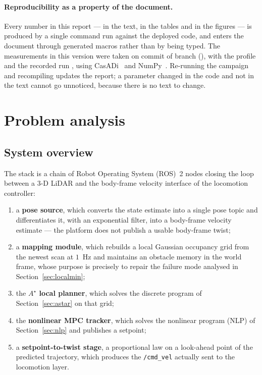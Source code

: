 \documentclass[11pt,a4paper]{article}
\newcommand{\astar}{$A^\star$}
\begin{document}
\paragraph{Reproducibility as a property of the document.}
\begin{sloppypar}
Every number in this report --- in the text, in the tables and in the figures --- is produced by a single
command run against the deployed code, and enters the document through generated macros rather than by being
typed. The measurements in this version were taken on commit \texttt{\resCommit} of branch
\texttt{\resBranch} (\resDate), with the profile \resProfile{} and the recorded run \resBag, using
CasADi~\resCasadi{} and NumPy~\resNumpy. Re-running the campaign and recompiling updates the report;
a parameter changed in the code and not in the text cannot go unnoticed, because there is no text to change.
\end{sloppypar}

\section{Problem analysis}
\label{sec:problem}

\subsection{System overview}
\label{sec:overview}

The stack is a chain of Robot Operating System (ROS)~2 nodes closing the loop between a 3-D LiDAR and the body-frame velocity
interface of the locomotion controller:

\begin{enumerate}[label=\arabic*.]
  \item a \textbf{pose source}, which converts the state estimate into a single pose topic and differentiates
        it, with an exponential filter, into a body-frame velocity estimate --- the platform does not publish
        a usable body-frame twist;
  \item a \textbf{mapping module}, which rebuilds a local Gaussian occupancy grid from the newest scan at
        $1$~Hz and maintains an obstacle memory in the world frame, whose purpose is precisely to repair the
        failure mode analysed in Section~\ref{sec:localmin};
  \item the \textbf{\astar{} local planner}, which solves the discrete program of Section~\ref{sec:astar} on
        that grid;
  \item the \textbf{nonlinear MPC tracker}, which solves the nonlinear program (NLP) of Section~\ref{sec:nlp} and publishes a
        setpoint;
  \item a \textbf{setpoint-to-twist stage}, a proportional law on a look-ahead point of the predicted
        trajectory, which produces the \texttt{/cmd\_vel} actually sent to the locomotion layer.
\end{enumerate}
\end{document}
